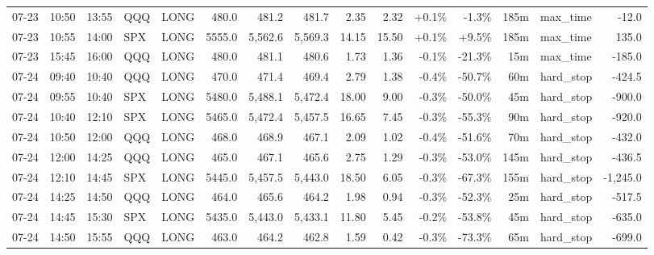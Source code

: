 \documentclass[11pt,a4paper,twoside]{article}
\begin{document}
\begin{landscape}
\begin{center}
\begin{longtable}{>{\color{txtmain}}l l l l l r r r r r r r r >{\color{txtmain}}l r}
07-23 & 10:50 & 13:55 & QQQ & LONG & 480.0 & 481.2 & 481.7 & 2.35 & 2.32 & \textcolor{wingreen}{+0.1\%} & \textcolor{lossred}{-1.3\%} & 185m & max\_time & \textcolor{lossred}{-12.0} \\
07-23 & 10:55 & 14:00 & SPX & LONG & 5555.0 & 5,562.6 & 5,569.3 & 14.15 & 15.50 & \textcolor{wingreen}{+0.1\%} & \textcolor{wingreen}{+9.5\%} & 185m & max\_time & \textcolor{wingreen}{135.0} \\
07-23 & 15:45 & 16:00 & QQQ & LONG & 480.0 & 481.1 & 480.6 & 1.73 & 1.36 & \textcolor{lossred}{-0.1\%} & \textcolor{lossred}{-21.3\%} & 15m & max\_time & \textcolor{lossred}{-185.0} \\
07-24 & 09:40 & 10:40 & QQQ & LONG & 470.0 & 471.4 & 469.4 & 2.79 & 1.38 & \textcolor{lossred}{-0.4\%} & \textcolor{lossred}{-50.7\%} & 60m & hard\_stop & \textcolor{lossred}{-424.5} \\
07-24 & 09:55 & 10:40 & SPX & LONG & 5480.0 & 5,488.1 & 5,472.4 & 18.00 & 9.00 & \textcolor{lossred}{-0.3\%} & \textcolor{lossred}{-50.0\%} & 45m & hard\_stop & \textcolor{lossred}{-900.0} \\
07-24 & 10:40 & 12:10 & SPX & LONG & 5465.0 & 5,472.4 & 5,457.5 & 16.65 & 7.45 & \textcolor{lossred}{-0.3\%} & \textcolor{lossred}{-55.3\%} & 90m & hard\_stop & \textcolor{lossred}{-920.0} \\
07-24 & 10:50 & 12:00 & QQQ & LONG & 468.0 & 468.9 & 467.1 & 2.09 & 1.02 & \textcolor{lossred}{-0.4\%} & \textcolor{lossred}{-51.6\%} & 70m & hard\_stop & \textcolor{lossred}{-432.0} \\
07-24 & 12:00 & 14:25 & QQQ & LONG & 465.0 & 467.1 & 465.6 & 2.75 & 1.29 & \textcolor{lossred}{-0.3\%} & \textcolor{lossred}{-53.0\%} & 145m & hard\_stop & \textcolor{lossred}{-436.5} \\
07-24 & 12:10 & 14:45 & SPX & LONG & 5445.0 & 5,457.5 & 5,443.0 & 18.50 & 6.05 & \textcolor{lossred}{-0.3\%} & \textcolor{lossred}{-67.3\%} & 155m & hard\_stop & \textcolor{lossred}{-1,245.0} \\
07-24 & 14:25 & 14:50 & QQQ & LONG & 464.0 & 465.6 & 464.2 & 1.98 & 0.94 & \textcolor{lossred}{-0.3\%} & \textcolor{lossred}{-52.3\%} & 25m & hard\_stop & \textcolor{lossred}{-517.5} \\
07-24 & 14:45 & 15:30 & SPX & LONG & 5435.0 & 5,443.0 & 5,433.1 & 11.80 & 5.45 & \textcolor{lossred}{-0.2\%} & \textcolor{lossred}{-53.8\%} & 45m & hard\_stop & \textcolor{lossred}{-635.0} \\
07-24 & 14:50 & 15:55 & QQQ & LONG & 463.0 & 464.2 & 462.8 & 1.59 & 0.42 & \textcolor{lossred}{-0.3\%} & \textcolor{lossred}{-73.3\%} & 65m & hard\_stop & \textcolor{lossred}{-699.0} \\

\end{longtable}
\end{center}
\end{landscape}
\end{document}
